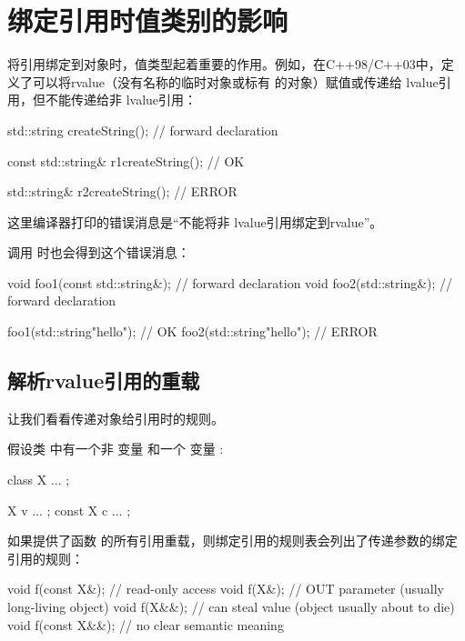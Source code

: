 \section{绑定引用时值类别的影响}
将引用绑定到对象时，值类型起着重要的作用。例如，在C++98/C++03中，定义了可以将rvalue（没有名称的临时对象或标有  的对象）赋值或传递给  lvalue引用，但不能传递给非  lvalue引用：

\begin{cppcode}
std::string createString(); // forward declaration

const std::string& r1{createString()}; // OK

std::string& r2{createString()}; // ERROR
\end{cppcode}

这里编译器打印的错误消息是“不能将非  lvalue引用绑定到rvalue”。

调用  时也会得到这个错误消息：

\begin{cppcode}
void foo1(const std::string&); // forward declaration
void foo2(std::string&); // forward declaration

foo1(std::string{"hello"}); // OK
foo2(std::string{"hello"}); // ERROR
\end{cppcode}

\subsection{解析rvalue引用的重载}

让我们看看传递对象给引用时的规则。

假设类  中有一个非  变量  和一个  变量 :

\begin{cppcode}
class X {
	...
};

X v{ ... };
const X c{ ... };
\end{cppcode}

如果提供了函数  的所有引用重载，则绑定引用的规则表会列出了传递参数的绑定引用的规则：

\begin{cppcode}
void f(const X&); // read-only access
void f(X&); // OUT parameter (usually long-living object)
void f(X&&); // can steal value (object usually about to die)
void f(const X&&); // no clear semantic meaning
\end{cppcode}

